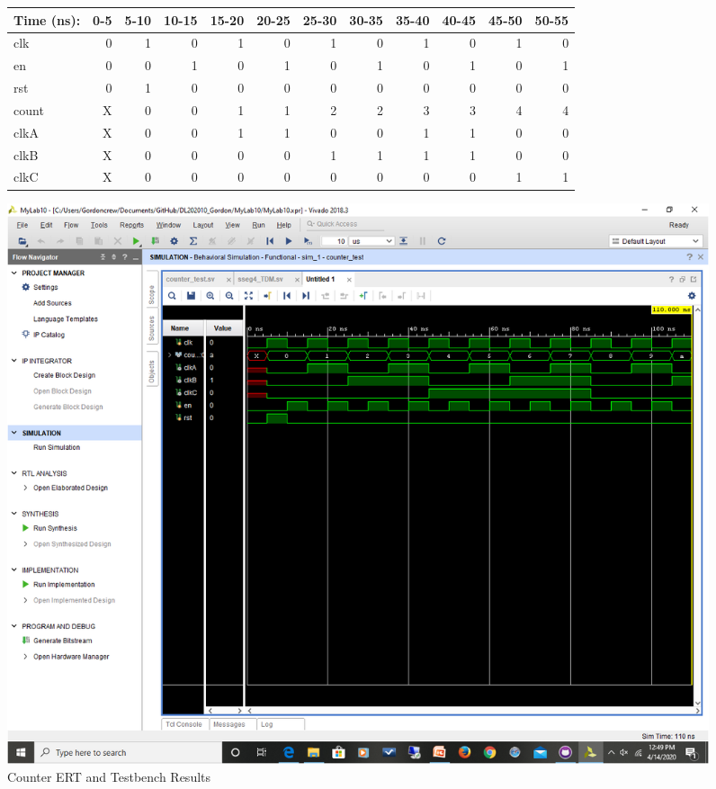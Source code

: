 \documentclass[11pt]{article}
\begin{document}
\begin{figure}[ht]\centering
	\begin{tabular}{l|rrrrrrrrrrr}
		Time (ns): & 0-5 & 5-10 & 10-15 & 15-20 & 20-25 & 25-30 & 30-35 & 35-40 & 40-45 & 45-50 & 50-55 \\
		\midrule 
		clk & 0 & 1 & 0 & 1 & 0 & 1 & 0 & 1 & 0 & 1 & 0 \\
		en & 0 & 0 & 1 & 0 & 1 & 0 & 1 & 0 & 1 & 0 & 1 \\
		rst & 0 & 1 & 0 & 0 & 0 & 0 & 0 & 0 & 0 & 0 & 0 \\
		\midrule
		count & X & 0 & 0 & 1 & 1 & 2 & 2 & 3 & 3 & 4 & 4  \\
		clkA & X & 0 & 0 & 1 & 1 & 0 & 0 & 1 & 1 & 0 & 0  \\
		clkB & X & 0 & 0 & 0 & 0 & 1 & 1 & 1 & 1 & 0 & 0  \\
		clkC & X & 0 & 0 & 0 & 0 & 0 & 0 & 0 & 0 & 1 & 1  \\
		\bottomrule
	\end{tabular}\medskip

	\includegraphics[width=1.15\textwidth, trim=7.5cm 14cm 0cm 4cm,clip]{counter.png}
	\caption{Counter ERT and Testbench Results}
	\label{fig:sim_with_table}
\end{figure}
\end{document}
